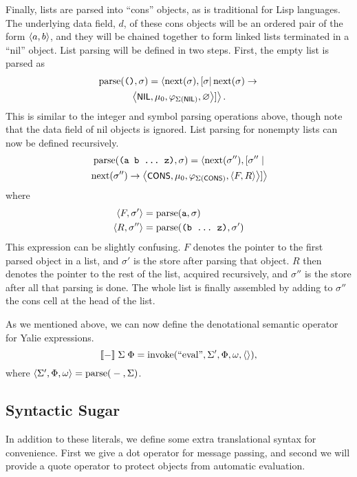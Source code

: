 \documentclass[twocolumn]{article}
\begin{document}
Finally, lists are parsed into ``cons'' objects, as is traditional for
Lisp languages. The underlying data field, $d$, of these cons objects
will be an ordered pair of the form $\left< a,b\right>$, and they will be
chained together to form linked lists terminated in a ``nil''
object. List parsing will be defined in two steps. First, the empty
list is parsed as
\begin{multline*}
  \operatorname{parse}(\texttt{()},\sigma) = \left<\operatorname{next}(\sigma),
  [\sigma|\operatorname{next}(\sigma) \rightarrow \right.\\
\left.\left<\text{\sf \small NIL}, \mu_0, \varphi_{\Sigma(\text{\sf NIL})}, \varnothing\right>]\right>.
\end{multline*}
This is similar to the integer and symbol parsing operations above,
though note that the data field of nil objects is ignored. List
parsing for nonempty lists can now be defined recursively.
\begin{multline*} \operatorname{parse}(\texttt{(a b \ldots\ z)},\sigma) = \left<
  \operatorname{next}(\sigma''),[\sigma'' \right. |\\\left.\operatorname{next}(\sigma'')
  \rightarrow\left<\text{\sf \small CONS}, \mu_0,
  \varphi_{\Sigma(\text{\sf CONS})},
  \left< F, R \right> \right> ] \right>
\end{multline*}
where
\begin{align*}
  \left< F, \sigma' \right> &= \operatorname{parse}( \texttt{a}, \sigma ) \\
  \left< R, \sigma'' \right> &= \operatorname{parse}( \texttt{(b \ldots\ z)}, \sigma')
\end{align*}
This expression can be slightly confusing. $F$ denotes the pointer to
the first parsed object in a list, and $\sigma'$ is the store after
parsing that object. $R$ then denotes the pointer to the rest of the
list, acquired recursively, and $\sigma''$ is the store after all that
parsing is done. The whole list is finally assembled by adding to
$\sigma''$ the cons cell at the head of the list.

As we mentioned above, we can now define the denotational semantic
operator for Yalie expressions.
\[ [\![-]\!]\phantom{,}\Sigma\phantom{,}\Phi = \operatorname{invoke}(\text{``eval''},
\Sigma', \Phi, \omega, \left<\right>),\] where $\left< \Sigma', \Phi, \omega\right>
= \operatorname{parse}({}-{},\Sigma)$.

\subsection*{Syntactic Sugar}
In addition to these literals, we define some extra translational
syntax for convenience. First we give a dot operator for message
passing, and second we will provide a quote operator to protect
objects from automatic evaluation.
\end{document}
